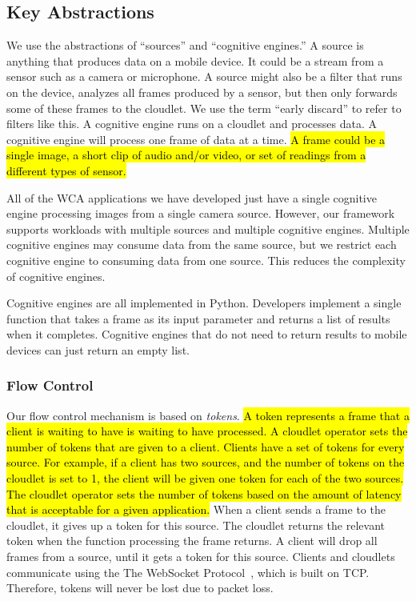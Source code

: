 \subsection{Key Abstractions}

We use the abstractions of ``sources'' and ``cognitive engines.'' A source is
anything that produces data on a mobile device. It could be a stream from a
sensor such as a camera or microphone. A source might also be a filter that runs
on the device, analyzes all frames produced by a sensor, but then only forwards
some of these frames to the
cloudlet. We use the term ``early discard'' to refer to filters like
this. A cognitive engine runs on a cloudlet and processes data. A cognitive
engine will process one frame of data at a time.
\hl{
  A frame could be a single image, a short clip of audio and/or video, or set of
  readings from a different types of sensor.
}

All of the WCA applications we have developed just
have a single cognitive engine processing images from a single camera source.
However, our framework supports workloads with multiple sources and multiple
cognitive engines. Multiple cognitive engines may consume data from the same
source, but we restrict each cognitive engine to consuming data from one source.
This reduces the complexity of cognitive engines.

Cognitive engines are all implemented in Python. Developers implement a single
function that takes a frame as its input parameter and returns a list of
results when it completes. Cognitive engines that do not need to return results
to mobile devices can just return an empty list.

\subsubsection{Flow Control}

Our flow control mechanism is based on \emph{tokens}.
\hl{
  A token represents a frame that a client is waiting to have is waiting to have
  processed.
  A cloudlet operator sets the number of tokens that are given to a client.
  Clients have a set of tokens for every source.
  For example, if a client has two sources, and the number of tokens on the
  cloudlet is set to 1, the client will be given one token for each of the two
  sources.
  The cloudlet operator sets the number of tokens based on the amount of latency
  that is acceptable for a given application.
}
When a client
sends a frame to the cloudlet, it gives up a token for this source. The cloudlet
returns the relevant token when the function processing the frame returns.
A client will drop all frames from a source, until it gets a token for this
source. Clients and
cloudlets communicate using the The WebSocket Protocol~\cite{websocket}, which
is built on TCP.
Therefore, tokens will never be lost due to packet loss.

